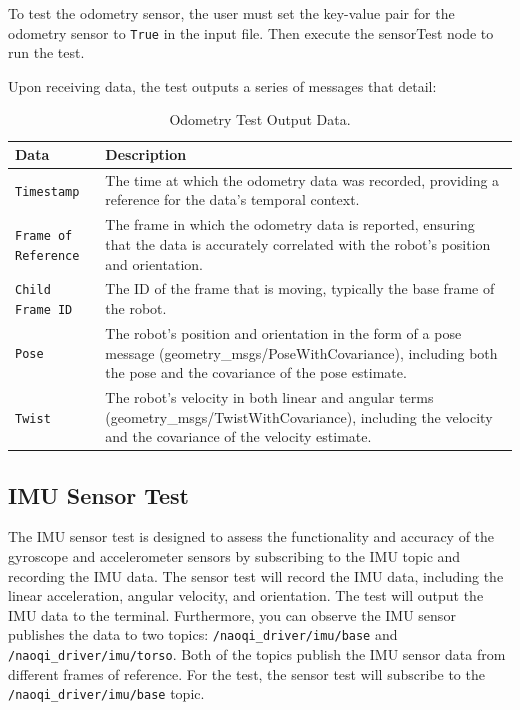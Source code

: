\documentclass{CSSRforAfrica}
\begin{document}
To test the odometry sensor, the user must set the key-value pair for the odometry sensor to \texttt{True} in the input file. 
Then execute the sensorTest node to run the test.

Upon receiving data, the test outputs a series of messages that detail:
\begin{longtable}[c]{|l|p{10cm}|}
    \caption{Odometry Test Output Data.} \label{tab:odometry_test_output}\\
    \hline
    \rowcolor{gray!30}
    \textbf{Data} & \textbf{Description} \\ \hline
    \endhead %
    \small{\texttt{Timestamp}} & \small{The time at which the odometry data was recorded, providing a reference for the data's temporal context.} \\ \hline
    \small{\texttt{Frame of Reference}} & \small{The frame in which the odometry data is reported, ensuring that the data is accurately correlated with the robot's position and orientation.} \\ \hline
    \small{\texttt{Child Frame ID}} & \small{The ID of the frame that is moving, typically the base frame of the robot.} \\ \hline
    \small{\texttt{Pose}} & \small{The robot's position and orientation in the form of a pose message (geometry\_msgs/PoseWithCovariance), including both the pose and the covariance of the pose estimate.} \\ \hline
    \small{\texttt{Twist}} & \small{The robot's velocity in both linear and angular terms (geometry\_msgs/TwistWithCovariance), including the velocity and the covariance of the velocity estimate.} \\ \hline

\end{longtable}


\subsection{IMU Sensor Test}
The IMU sensor test is designed to assess the functionality and accuracy of the gyroscope and accelerometer sensors by subscribing to the IMU topic and recording the IMU data. 
The sensor test will record the IMU data, including the linear acceleration, angular velocity, and orientation. The test will output the IMU data to the terminal. Furthermore,
you can observe the IMU sensor publishes the data to two topics: \texttt{/naoqi\_driver/imu/base} and \texttt{/naoqi\_driver/imu/torso}. Both of the topics publish the IMU sensor 
data from different frames of reference. For the test, the sensor test will subscribe to the \texttt{/naoqi\_driver/imu/base} topic. 
\end{document}

